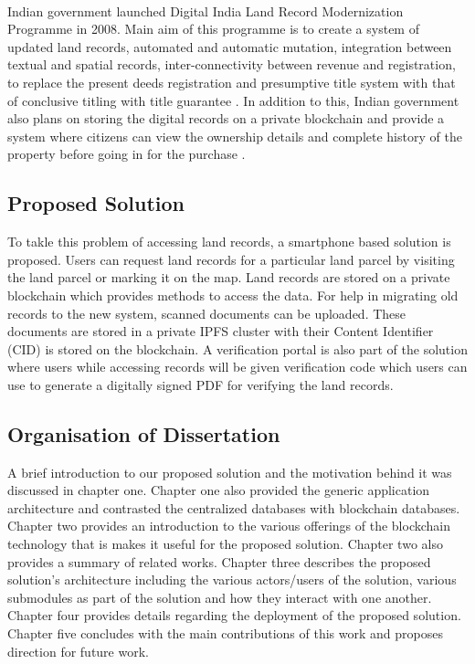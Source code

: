 \documentclass{article}
\begin{document}
        \paragraph{}
        Indian government launched Digital India Land Record Modernization Programme in 2008. Main aim of this programme is to create a system of updated land records, automated and automatic mutation, integration between textual and spatial records, inter-connectivity between revenue and registration, to replace the present deeds registration and presumptive title system with that of conclusive titling with title guarantee \cite{dilrmp}. In addition to this, Indian government also plans on storing the digital records on a private blockchain and provide a system where citizens can view the ownership details and complete history of the property before going in for the purchase \cite{blockchaingovin}.  

    \subsection{Proposed Solution}
        To takle this problem of accessing land records, a smartphone based solution is proposed. Users can request land records for a particular land parcel by visiting the land parcel or marking it on the map. Land records are stored on a private blockchain which provides methods to access the data. For help in migrating old records to the new system, scanned documents can be uploaded. These documents are stored in a private IPFS cluster with their Content Identifier (CID) is stored on the blockchain. A verification portal is also part of the solution where users while accessing records will be given verification code which users can use to generate a digitally signed PDF for verifying the land records. 
        
    \subsection{Organisation of Dissertation}
        A brief introduction to our proposed solution and the motivation behind it was discussed in chapter one. Chapter one also provided the generic application architecture and contrasted the centralized databases with blockchain databases. Chapter two provides an introduction to the various offerings of the blockchain technology that is makes it useful for the proposed solution. Chapter two also provides a summary of related works. Chapter three describes the proposed solution's architecture including the various actors/users of the solution, various submodules as part of the solution and how they interact with one another. Chapter four provides details regarding the deployment of the proposed solution. Chapter five concludes with the main contributions of this work and proposes direction for future work.
        
\end{document}
